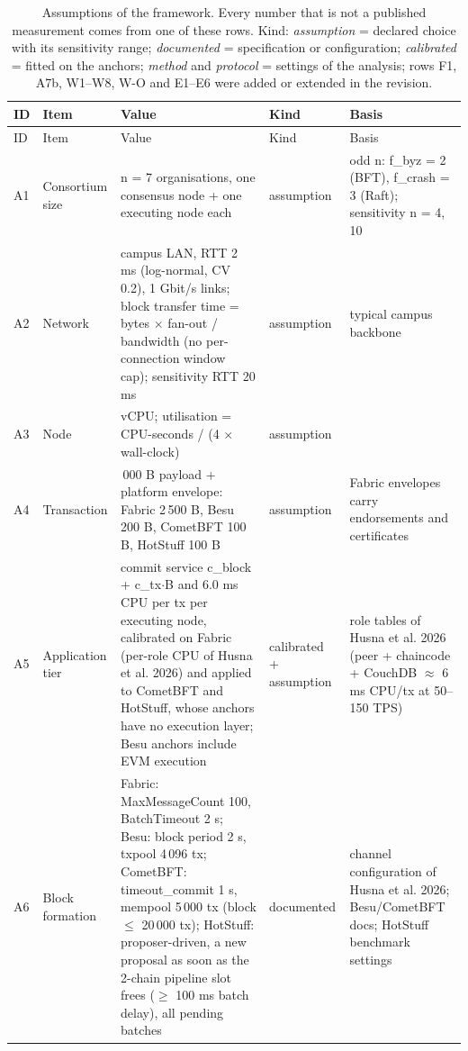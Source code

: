 \documentclass[a4paper,10pt]{article}
\begin{document}
\footnotesize
\begin{longtable}{>{\raggedright\arraybackslash}p{0.9cm} >{\raggedright\arraybackslash}p{3.2cm} >{\raggedright\arraybackslash}p{8.6cm} >{\raggedright\arraybackslash}p{2.6cm} >{\raggedright\arraybackslash}p{7.2cm}}
\caption{Assumptions of the framework. Every number that is not a published measurement comes from one of these rows.
Kind: \emph{assumption} = declared choice with its sensitivity range; \emph{documented} = specification or configuration;
\emph{calibrated} = fitted on the anchors; \emph{method} and \emph{protocol} = settings of the analysis; rows F1, A7b,
W1--W8, W-O and E1--E6 were added or extended in the revision.}\label{tab:S1}\\
\toprule ID & Item & Value & Kind & Basis\\ \midrule \endfirsthead
\toprule ID & Item & Value & Kind & Basis\\ \midrule \endhead
\bottomrule \endfoot
A1 & Consortium size & n = 7 organisations, one consensus node + one executing node each & assumption & odd n: f\_byz = 2 (BFT), f\_crash = 3 (Raft); sensitivity n = 4, 10\\
A2 & Network & campus LAN, RTT 2 ms (log-normal, CV 0.2), 1 Gbit/s links; block transfer time = bytes $\times$ fan-out / bandwidth (no per-connection window cap); sensitivity RTT 20 ms & assumption & typical campus backbone\\
A3 & Node & 4 vCPU; utilisation = CPU-seconds / (4 $\times$ wall-clock) & assumption & \\
A4 & Transaction & 1\,000 B payload + platform envelope: Fabric 2\,500 B, Besu 200 B, CometBFT 100 B, HotStuff 100 B & assumption & Fabric envelopes carry endorsements and certificates\\
A5 & Application tier & commit service c\_block + c\_tx$\cdot$B and 6.0 ms CPU per tx per executing node, calibrated on Fabric (per-role CPU of Husna et al. 2026) and applied to CometBFT and HotStuff, whose anchors have no execution layer; Besu anchors include EVM execution & calibrated + assumption & role tables of Husna et al. 2026 (peer + chaincode + CouchDB $\approx$ 6 ms CPU/tx at 50--150 TPS)\\
A6 & Block formation & Fabric: MaxMessageCount 100, BatchTimeout 2 s; Besu: block period 2 s, txpool 4\,096 tx; CometBFT: timeout\_commit 1 s, mempool 5\,000 tx (block $\leq$ 20\,000 tx); HotStuff: proposer-driven, a new proposal as soon as the 2-chain pipeline slot frees ($\geq$ 100 ms batch delay), all pending batches & documented & channel configuration of Husna et al. 2026; Besu/CometBFT docs; HotStuff benchmark settings\\

\end{longtable}
\end{document}
